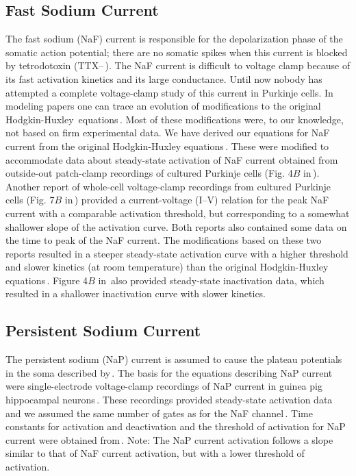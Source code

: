 \documentclass[12pt]{article}
\begin{document}
\subsection*{Fast Sodium Current}

The fast sodium (NaF) current is responsible for the depolarization phase of the somatic action potential; there are no somatic spikes when this current is blocked by tetrodotoxin (TTX--\,\cite{R:1980ly}). The NaF current is difficult to voltage clamp because of its fast activation kinetics and its large conductance. Until now nobody has attempted a complete voltage-clamp study of this current in Purkinje cells. In modeling papers one can trace an evolution of modifications to the original Hodgkin-Huxley\,\cite{hodgkin52:_quantitative_description} equations\,\cite{W:1991qa, D:1982lh, Wilson:1989ff}. Most of these modifications were, to our knowledge, not based on firm experimental data. We have derived our equations for NaF current from the original Hodgkin-Huxley equations\,\cite{hodgkin52:_quantitative_description}. These were modified to accommodate data about steady-state activation of NaF current obtained from outside-out patch-clamp recordings of cultured Purkinje cells (Fig. 4$B$ in\,\cite{Gahwiler:1989fk}). Another report of whole-cell voltage-clamp recordings from cultured Purkinje cells (Fig. 7$B$ in\,\cite{Hirano:1989uq}) provided a current-voltage (I--V) relation for the peak NaF current with a comparable activation threshold, but corresponding to a somewhat shallower slope of the activation curve. Both reports also contained some data on the time to peak of the NaF current. The modifications based on these two reports resulted in a steeper steady-state activation curve with a higher threshold and slower kinetics (at room temperature) than the original Hodgkin-Huxley equations\,\cite{hodgkin52:_quantitative_description}. Figure 4$B$ in\,\cite{Gahwiler:1989fk} also provided steady-state inactivation data, which resulted in a shallower inactivation curve with slower kinetics.

\subsection*{Persistent Sodium Current}

The persistent sodium (NaP) current is assumed to cause the plateau potentials in the soma described by\,\cite{R:1980ly}. The basis for the equations describing NaP current were single-electrode voltage-clamp recordings of NaP current in guinea pig hippocampal neurons\,\cite{C-R-French:1990uq}. These recordings provided steady-state activation data and we assumed the same number of gates as for the NaF channel\,\cite{hodgkin52:_quantitative_description}. Time constants for activation and deactivation and the threshold of activation for NaP current were obtained from\,\cite{Kay:1990kx}. Note: The NaP current activation follows a slope similar to that of NaF current activation, but with a lower threshold of activation.



\end{document}
